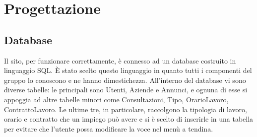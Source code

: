 \section{Progettazione}
	\subsection{Database}
Il sito, per funzionare correttamente, è connesso ad un database costruito in linguaggio SQL. È stato scelto questo linguaggio in quanto tutti i componenti del gruppo lo conoscono e ne hanno dimestichezza. 
All'interno del database vi sono diverse tabelle: le principali sono Utenti, Aziende e Annunci, e ognuna di esse si appoggia ad altre tabelle minori come Consultazioni, Tipo, OrarioLavoro, ContrattoLavoro. Le ultime tre, in particolare, raccolgono la tipologia di lavoro, orario e contratto che un impiego può avere e si è scelto di inserirle in una tabella per evitare che l'utente possa modificare la voce nel menù a tendina.   


